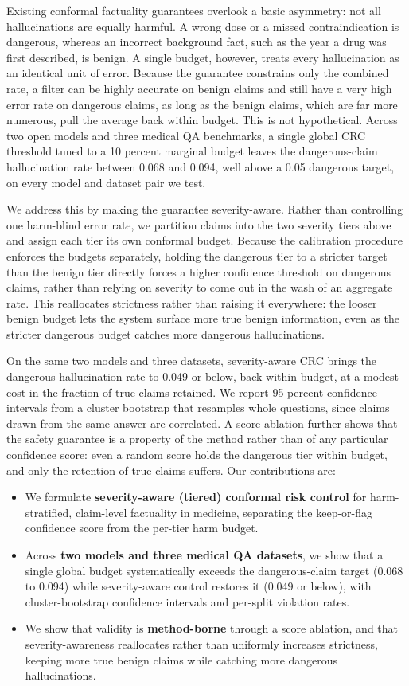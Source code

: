 Existing conformal factuality guarantees overlook a basic asymmetry: not all
hallucinations are equally harmful. A wrong dose or a missed contraindication is
dangerous, whereas an incorrect background fact, such as the year a drug was first
described, is benign. A single budget, however, treats every hallucination as an
identical unit of error. Because the guarantee constrains only the combined rate, a
filter can be highly accurate on benign claims and still have a very high error rate
on dangerous claims, as long as the benign claims, which are far more numerous, pull
the average back within budget. This is not hypothetical. Across two open models and
three medical QA benchmarks, a single global CRC threshold tuned to a 10 percent
marginal budget leaves the dangerous-claim hallucination rate between 0.068 and
0.094, well above a 0.05 dangerous target, on every model and dataset pair we test.

We address this by making the guarantee severity-aware. Rather than controlling one
harm-blind error rate, we partition claims into the two severity tiers above and
assign each tier its own conformal budget. Because the calibration procedure
enforces the budgets separately, holding the dangerous tier to a stricter target
than the benign tier directly forces a higher confidence threshold on dangerous
claims, rather than relying on severity to come out in the wash of an aggregate
rate. This reallocates strictness rather than raising it everywhere: the looser
benign budget lets the system surface more true benign information, even as the
stricter dangerous budget catches more dangerous hallucinations.

On the same two models and three datasets, severity-aware CRC brings the dangerous
hallucination rate to 0.049 or below, back within budget, at a modest cost in the
fraction of true claims retained. We report 95 percent confidence intervals from a
cluster bootstrap that resamples whole questions, since claims drawn from the same
answer are correlated. A score ablation further shows that the safety guarantee is a
property of the method rather than of any particular confidence score: even a random
score holds the dangerous tier within budget, and only the retention of true claims
suffers. Our contributions are:

\begin{itemize}
  \item We formulate \textbf{severity-aware (tiered) conformal risk control} for
  harm-stratified, claim-level factuality in medicine, separating the keep-or-flag
  confidence score from the per-tier harm budget.
  \item Across \textbf{two models and three medical QA datasets}, we show that a
  single global budget systematically exceeds the dangerous-claim target (0.068 to
  0.094) while severity-aware control restores it (0.049 or below), with
  cluster-bootstrap confidence intervals and per-split violation rates.
  \item We show that validity is \textbf{method-borne} through a score ablation, and
  that severity-awareness reallocates rather than uniformly increases strictness,
  keeping more true benign claims while catching more dangerous hallucinations.
\end{itemize}
